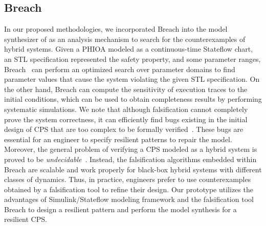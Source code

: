 \subsection{Breach}
%
%
In our proposed methodologies, we incorporated Breach into the model synthesizer of \toolreaffirm as an analysis mechanism to search for the counterexamples of hybrid systems. Given a PHIOA modeled as a continuous-time Stateflow chart, an STL specification represented the safety property, and some parameter ranges, Breach~\cite{donze2010breach} can perform an optimized search over parameter domains to find parameter values that cause the system violating the given STL specification. On the other hand, Breach can compute the sensitivity of execution traces to the initial conditions, which can be used to obtain completeness results by performing systematic simulations. We note that although falsification cannot completely prove the system correctness, it can efficiently find bugs existing in the initial design of CPS that are too complex to be formally verified~\cite{kapinski2015simulation}. These bugs are essential for an engineer to specify resilient patterns to repair the model. 
%
Moreover, the general problem of verifying a CPS modeled as a hybrid system is proved to be \emph{undecidable}~\cite{henzinger1995s}. Instead, the falsification algorithms embedded within Breach are scalable and work properly for black-box hybrid systems with different classes of dynamics.
%
Thus, in practice, engineers prefer to use counterexamples obtained by a falsification tool to refine their design. Our prototype \toolreaffirm utilizes the advantages of Simulink/Stateflow modeling framework and the falsification tool Breach to design a resilient pattern and perform the model synthesis for a resilient CPS.








